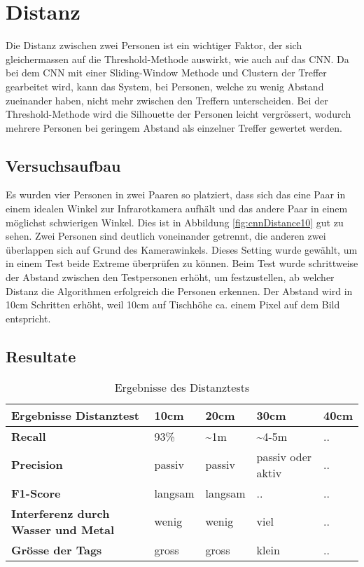 \section{Distanz}
\label{sec:distanz}

Die Distanz zwischen zwei Personen ist ein wichtiger Faktor, der sich gleichermassen auf die Threshold-Methode auswirkt, wie auch auf das \gls{CNN}. Da bei dem \gls{CNN} mit einer Sliding-Window Methode und Clustern der Treffer gearbeitet wird, kann das System, bei Personen, welche zu wenig Abstand zueinander haben, nicht mehr zwischen den Treffern unterscheiden. Bei der Threshold-Methode wird die Silhouette der Personen leicht vergrössert, wodurch mehrere Personen bei geringem Abstand als einzelner Treffer gewertet werden.

\subsection{Versuchsaufbau}

Es wurden vier Personen in zwei Paaren so platziert, dass sich das eine Paar in einem idealen Winkel zur Infrarotkamera aufhält und das andere Paar in einem möglichst schwierigen Winkel. Dies ist in Abbildung \ref{fig:cnnDistance10} gut zu sehen. Zwei Personen sind deutlich voneinander getrennt, die anderen zwei überlappen sich auf Grund des Kamerawinkels. Dieses Setting wurde gewählt, um in einem Test beide Extreme überprüfen zu können. 
Beim Test wurde schrittweise der Abstand zwischen den Testpersonen erhöht, um festzustellen, ab welcher Distanz die Algorithmen erfolgreich die Personen erkennen. Der Abstand wird in 10cm Schritten erhöht, weil 10cm auf Tischhöhe ca. einem Pixel auf dem Bild entspricht.

\subsection{Resultate}

\begin{table}[H]
	\begin{tabularx}{\textwidth}{|X|X|X|X|X|}
		\hline
		\textbf{Ergebnisse Distanztest} & \textbf{10cm} & \textbf{20cm} & \textbf{30cm} & \textbf{40cm}\\
		\hline 
		\textbf{Recall} & 93\% & \textasciitilde 1m & \textasciitilde 4-5m & ..\\
		\hline  
		\textbf{Precision} & passiv & passiv & passiv oder aktiv & ..\\
		\hline
		\textbf{F1-Score} & langsam & langsam & .. & ..\\
		\hline
		\textbf{Interferenz durch Wasser und Metal} & wenig & wenig & viel & ..\\
		\hline
		\textbf{Grösse der Tags} & gross & gross & klein & ..\\
		\hline
	\end{tabularx}
	\caption{Ergebnisse des Distanztests}
	\label{tbl:distance}
\end{table}


